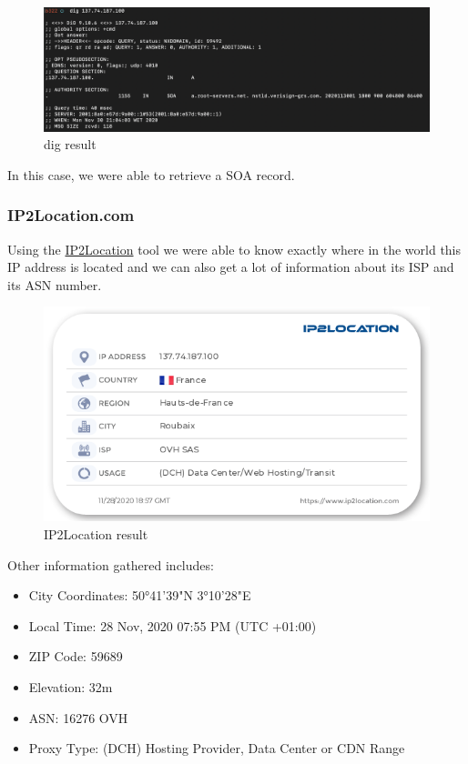 \pagebreak

\begin{figure}[ht!]
 	\centering
 	\includegraphics[width=1\linewidth]{img/dig1.png}
 	\caption{dig result}
 \end{figure}

In this case, we were able to retrieve a SOA record.

\subsubsection{IP2Location.com}

Using the \href{https://www.ip2location.com/demo}{IP2Location} tool we were able to know exactly where in the world this IP address is located and we can also get a lot of information about its ISP and its ASN number.

\begin{figure}[ht!]
 	\centering
 	\includegraphics[width=0.7\linewidth]{img/ip2location137.png}
 	\caption{IP2Location result}
 \end{figure}
 
 
 Other information gathered includes:
 \begin{itemize}
    \item City Coordinates: 50°41'39"N   3°10'28"E
    \item Local Time: 28 Nov, 2020 07:55 PM (UTC +01:00)
    \item ZIP Code: 59689
    \item Elevation: 32m
    \item ASN: 16276 OVH
    \item Proxy Type: (DCH) Hosting Provider, Data Center or CDN Range
 \end{itemize}
 
